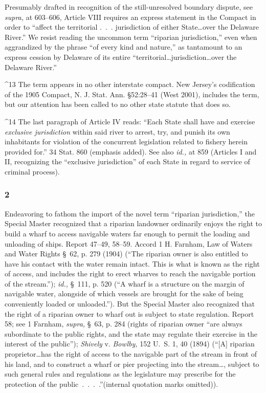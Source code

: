 {\noindent Presumably drafted in recognition of the still-unresolved boundary
dispute, see \emph{supra,} at 603--606, Article VIII requires an
express statement in the Compact in order to ``affect the territorial
.~.~. jurisdiction of either State\dots over the Delaware River.''
We resist reading the uncommon term ``riparian jurisdiction,''
even when aggrandized by the \newpage  phrase ``of every kind and
nature,'' as tantamount to an express cession by Delaware of its entire
``territorial\dots jurisdiction\dots over the Delaware River.''

^13 The term appears in no other interstate compact. New Jersey's
codification of the 1905 Compact, N. J. Stat. Ann. \S52:28--41 (West
2001), includes the term, but our attention has been called to no
other state statute that does so.

^14 The last paragraph of Article IV reads: ``Each State shall have
and exercise \emph{exclusive jurisdiction} within said river to arrest,
try, and punish its own inhabitants for violation of the concurrent
legislation related to fishery herein provided for.'' 34 Stat.
860 (emphasis added). See also \emph{id.,} at 859 (Articles I and II,
recognizing the ``exclusive jurisdiction'' of each State in regard to
service of criminal process).

\subsubsection{2}

  Endeavoring to fathom the import of the novel term ``riparian
jurisdiction,'' the Special Master recognized that a riparian landowner
ordinarily enjoys the right to build a wharf to access navigable waters
far enough to permit the loading and unloading of ships. Report
47--49, 58--59. Accord 1 H. Farnham, Law of Waters and Water Rights
\S~62, p. 279 (1904) (``The riparian owner is also entitled to have
his contact with the water remain intact. This is what is known as the
right of access, and includes the right to erect wharves to reach the
navigable portion of the stream.''); \emph{id.,} \S~111, p. 520 (``A
wharf is a structure on the margin of navigable water, alongside of
which vessels are brought for the sake of being conveniently loaded
or unloaded.''). But the Special Master also recognized that the
right of a riparian owner to wharf out is subject to state regulation.
Report 58; see 1 Farnham, \emph{supra,} \S~63, p. 284 (rights of
riparian owner ``are always subordinate to the public rights, and the
state may regulate their exercise in the interest of the public'');
\emph{Shively} v. \emph{Bowlby,} 152 U.~S. 1, 40 (1894) (``[A] riparian
proprietor\dots has the right of access to the navigable part of
the stream in front of his land, and to construct a wharf or pier
projecting into the stream\dots , subject to such general rules and
regulations as the legislature may prescribe for the protection of the
public~.~.~.~.''(internal quotation marks omitted)).

}
